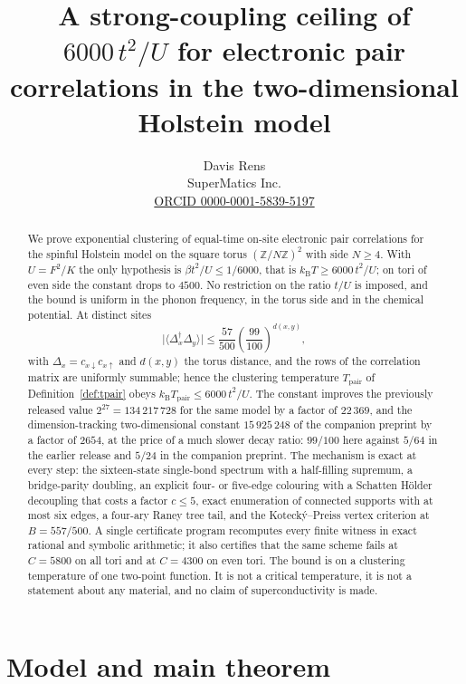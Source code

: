 \documentclass[11pt]{article}
\title{A strong-coupling ceiling of $6000\,t^{2}/U$ for electronic pair
correlations in the two-dimensional Holstein model}
\author{Davis Rens\\SuperMatics Inc.\\\href{https://orcid.org/0000-0001-5839-5197}{ORCID 0000-0001-5839-5197}}
\date{}
\theoremstyle{plain}
\theoremstyle{definition}
\newcommand{\Dop}{\Delta}
\begin{document}
\maketitle

\begin{abstract}
We prove exponential clustering of equal-time on-site electronic pair correlations
for the spinful Holstein model on the square torus $(\mathbb{Z}/N\mathbb{Z})^2$ with
side $N\ge4$. With $U=F^{2}/K$ the only hypothesis is $\beta t^{2}/U\le 1/6000$,
that is $k_{\mathrm{B}}T\ge 6000\,t^{2}/U$; on tori of even side the constant drops
to $4500$. No restriction on the ratio $t/U$ is imposed, and the bound is uniform in
the phonon frequency, in the torus side and in the chemical potential. At distinct
sites
\[
 \bigl|\langle\Dop_x^\dagger\Dop_y\rangle\bigr|
 \le \frac{57}{500}\left(\frac{99}{100}\right)^{d(x,y)},
\]
with $\Dop_x=c_{x\downarrow}c_{x\uparrow}$ and $d(x,y)$ the torus distance, and the
rows of the correlation matrix are uniformly summable; hence the clustering
temperature $T_{\mathrm{pair}}$ of Definition~\ref{def:tpair} obeys
$k_{\mathrm{B}}T_{\mathrm{pair}}\le6000\,t^{2}/U$. The constant improves the
previously released value $2^{27}=134\,217\,728$ for the same model by a factor of
$22\,369$, and the dimension-tracking two-dimensional constant $15\,925\,248$ of the
companion preprint by a factor of $2654$, at the price of a much slower decay ratio:
$99/100$ here against $5/64$ in the earlier release and $5/24$ in the companion
preprint.
The mechanism is exact at every step: the sixteen-state single-bond spectrum with a
half-filling supremum, a bridge-parity doubling, an explicit four- or five-edge
colouring with a Schatten H\"older decoupling that costs a factor $c\le5$, exact
enumeration of connected supports with at most six edges, a four-ary Raney tree tail,
and the Koteck\'y--Preiss vertex criterion at $B=557/500$. A single certificate
program recomputes every finite witness in exact rational and symbolic arithmetic;
it also certifies that the same scheme fails at $C=5800$ on all tori and at
$C=4300$ on even tori. The bound is on a clustering temperature of one two-point
function. It is not a critical temperature, it is not a statement about any
material, and no claim of superconductivity is made.
\end{abstract}

\section{Model and main theorem}\label{sec:model}
\end{document}
